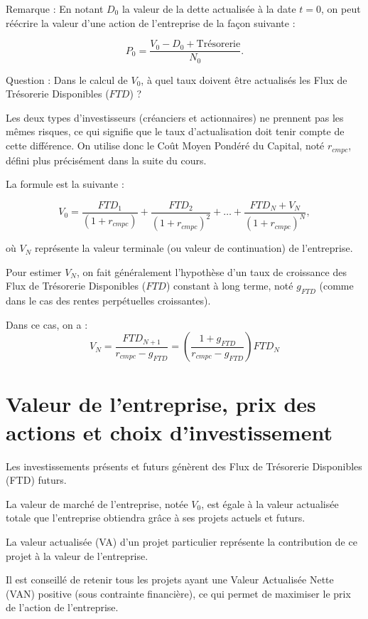 \documentclass[a4paper, 12pt]{report}
\begin{document}
Remarque : En notant \( D_0 \) la valeur de la dette actualisée à la date \( t = 0 \), on peut réécrire la valeur d'une action de l'entreprise de la façon suivante :

\[
P_0 = \frac{V_0 - D_0 + \text{Trésorerie}}{N_0}.
\]

Question : Dans le calcul de \( V_0 \), à quel taux doivent être actualisés les Flux de Trésorerie Disponibles (\( FTD \)) ?

Les deux types d'investisseurs (créanciers et actionnaires) ne prennent pas les mêmes risques, ce qui signifie que le taux d'actualisation doit tenir compte de cette différence. On utilise donc le Coût Moyen Pondéré du Capital, noté \( r_{cmpc} \), défini plus précisément dans la suite du cours.

La formule est la suivante :

\[
V_0 = \frac{FTD_1}{(1 + r_{cmpc})} + \frac{FTD_2}{(1 + r_{cmpc})^2} + \ldots + \frac{FTD_N + V_N}{(1 + r_{cmpc})^N},
\]

où \( V_N \) représente la valeur terminale (ou valeur de continuation) de l'entreprise.

Pour estimer \( V_N \), on fait généralement l'hypothèse d'un taux de croissance des Flux de Trésorerie Disponibles (\( FTD \)) constant à long terme, noté \( g_{FTD} \) (comme dans le cas des rentes perpétuelles croissantes).

Dans ce cas, on a :
\[
V_N = \frac{FTD_{N+1}}{r_{cmpc} - g_{FTD}}=\left(\frac{1+g_{FTD}}{r_{cmpc} - g_{FTD}} \right) FTD_N
\]

\section{Valeur de l'entreprise, prix des actions et choix d'investissement}

Les investissements présents et futurs génèrent des Flux de Trésorerie Disponibles (FTD) futurs.

La valeur de marché de l'entreprise, notée \( V_0 \), est égale à la valeur actualisée totale que l'entreprise obtiendra grâce à ses projets actuels et futurs.

La valeur actualisée (VA) d'un projet particulier représente la contribution de ce projet à la valeur de l'entreprise.

Il est conseillé de retenir tous les projets ayant une Valeur Actualisée Nette (VAN) positive (sous contrainte financière), ce qui permet de maximiser le prix de l'action de l'entreprise.
\end{document}
